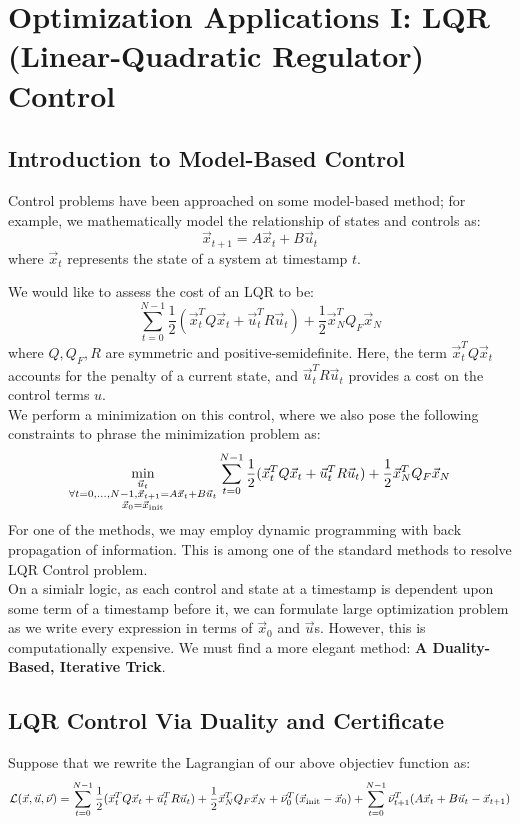 \chapter{Optimization Applications I: LQR (Linear-Quadratic Regulator) Control}

\section{Introduction to Model-Based Control}
Control problems have been approached on some model-based method; for example, we mathematically model the relationship of states and controls as:
\[
    \vec{x}_{t + 1} = A \vec{x}_t + B \vec{u}_t
\]
where $\vec{x}_t$ represents the state of a system at timestamp $t$.

We would like to assess the cost of an LQR to be:
\[
    \sum_{t = 0}^{N - 1} \frac{1}{2} (\vec{x}_t^T Q \vec{x}_t + \vec{u}_t^T R \vec{u}_t) + \frac{1}{2} \vec{x}_N^T Q_F \vec{x}_N
\]
where $Q, Q_F, R$ are symmetric and positive-semidefinite.
Here, the term $\vec{x}_t^T Q \vec{x}_t$ accounts for the penalty of a current state, and $\vec{u}_t^T R \vec{u}_t$ provides a cost on the control terms $u$. \\
We perform a minimization on this control, where we also pose the following constraints to phrase the minimization problem as:
\[
    \min_{
        \substack{
            \vec{u}_t \\
            \forall t = 0, \dots, N - 1, \vec{x}_{t + 1} = A \vec{x}_t + B \vec{u}_t \\
            \vec{x}_0 = \vec{x}_{\rm init}
        }
    } \sum_{t = 0}^{N - 1} \frac{1}{2} (\vec{x}_t^T Q \vec{x}_t + \vec{u}_t^T R \vec{u}_t) + \frac{1}{2} \vec{x}_N^T Q_F \vec{x}_N
\]
For one of the methods, we may employ dynamic programming with back propagation of information. This is among one of the standard methods to resolve LQR Control problem. \\
On a simialr logic, as each control and state at a timestamp is dependent upon some term of a timestamp before it, we can formulate large optimization problem as we write every expression in terms of $\vec{x}_0$ and $\vec{u}$s.
However, this is computationally expensive. We must find a more elegant method: \textbf{A Duality-Based, Iterative Trick}.

\section{LQR Control Via Duality and Certificate}
Suppose that we rewrite the Lagrangian of our above objectiev function as:
\[
    \mathcal{L}(\vec{x}, \vec{u}, \vec{\nu}) =
    \sum_{t = 0}^{N - 1} \frac{1}{2} (\vec{x}_t^T Q \vec{x}_t + \vec{u}_t^T R \vec{u}_t) + \frac{1}{2} \vec{x}_N^T Q_F \vec{x}_N + \vec{\nu}_0^T (\vec{x}_{\rm init} - \vec{x}_0) + \sum_{t = 0}^{N - 1} \vec{\nu}_{t + 1}^T (A \vec{x}_t + B \vec{u}_t - \vec{x}_{t + 1})
\]

